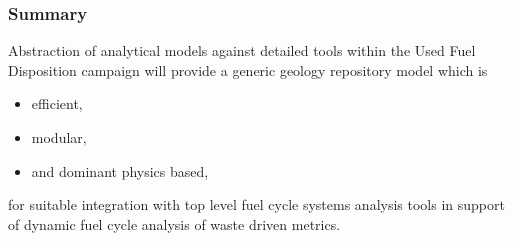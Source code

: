 \begin{frame}[ctb!]
  \frametitle{Summary}
  Abstraction of analytical models against detailed tools within the Used Fuel 
  Disposition campaign will  provide a generic geology repository model which is  
  \begin{itemize}
    \item efficient,
    \item modular,
    \item and dominant physics based,
  \end{itemize}
  for suitable integration with top level fuel cycle systems analysis tools in 
    support of dynamic fuel cycle analysis of waste driven metrics.
\end{frame}

